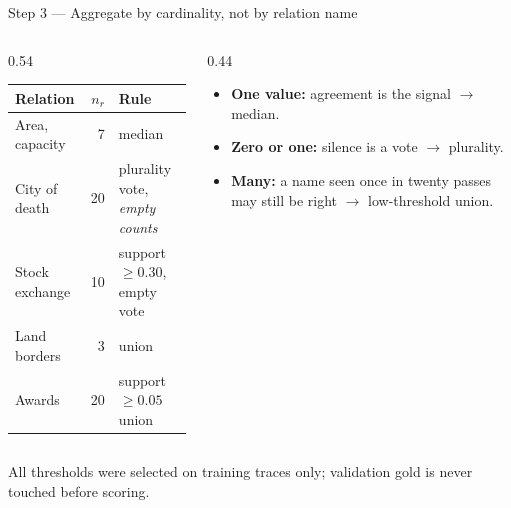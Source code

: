 \documentclass[aspectratio=169,10pt]{beamer}
\begin{document}
\begin{frame}{Step 3 --- Aggregate by cardinality, not by relation name}
  \begin{columns}[T]
    \begin{column}{0.54\textwidth}
      \small
      \begin{tabular}{@{}lrl@{}}
        \toprule
        Relation & $n_r$ & Rule \\
        \midrule
        Area, capacity & 7 & median \\
        City of death & 20 & plurality vote, \emph{empty counts} \\
        Stock exchange & 10 & support $\ge 0.30$, empty vote \\
        Land borders & 3 & union \\
        Awards & 20 & support $\ge 0.05$ union \\
        \bottomrule
      \end{tabular}
    \end{column}
    \begin{column}{0.44\textwidth}
      \begin{itemize}
        \item \textbf{One value:} agreement is the signal $\to$ median.
        \item \textbf{Zero or one:} silence is a vote $\to$ plurality.
        \item \textbf{Many:} a name seen once in twenty passes may still be
          right $\to$ low-threshold union.
      \end{itemize}
    \end{column}
  \end{columns}

  \vspace{5mm}
  All thresholds were selected on \alert{training traces only}; validation
  gold is never touched before scoring.
\end{frame}
\end{document}
